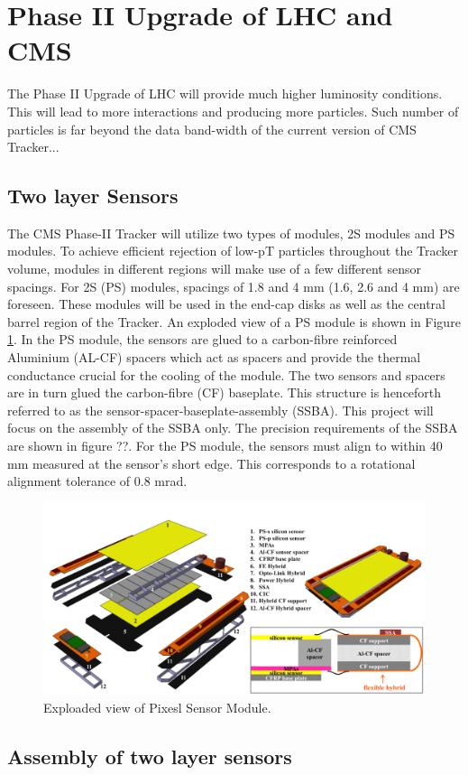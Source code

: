 \section{Phase II Upgrade of LHC and CMS}

The Phase II Upgrade of LHC will provide much higher luminosity conditions. This will lead to more interactions and producing more particles. Such number of particles is far beyond the data band-width of the current version of CMS Tracker...


\subsection{Two layer Sensors}
The CMS Phase-II Tracker will utilize two types of modules, 2S modules and PS modules. To achieve efficient rejection of low-pT particles throughout the Tracker volume, modules in different regions will make use of a few different sensor spacings. For 2S (PS) modules, spacings of 1.8 and 4 mm (1.6, 2.6 and 4 mm) are foreseen. These modules will be used in the end-cap disks as well as the central barrel region of the Tracker. An exploded view of a PS module is shown in Figure \ref{fig:ps_exploaded}. In the PS module, the sensors are glued to a carbon-fibre reinforced Aluminium (AL-CF) spacers which act as spacers and provide the thermal conductance crucial for the cooling of the module. The two sensors and spacers are in turn glued the carbon-fibre (CF) baseplate. This structure is henceforth referred to as the sensor-spacer-baseplate-assembly (SSBA). This project will focus on the assembly of the SSBA only. The precision requirements of the SSBA are shown in figure ??. For the PS module, the sensors must align to within 40 mm measured at the sensor’s short edge. This corresponds to a rotational alignment tolerance of 0.8 mrad.
\begin{figure}[ht]\centering
\includegraphics[width=0.8\linewidth]{Data/PS_exploaded.png}
\caption{Exploaded view of Pixesl Sensor Module.}
\label{fig:ps_exploaded}
\end{figure}

\subsection{Assembly of two layer sensors}

